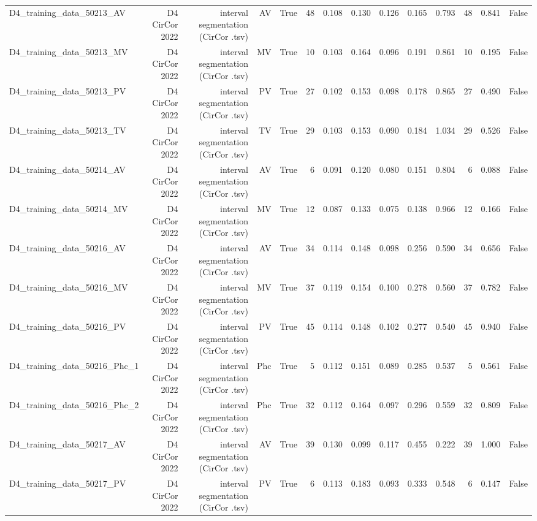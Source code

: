 \begin{table}[htbp]
\begin{tabular}{lrrrrrrrrrrrrr}
    D4\_training\_data\_50213\_AV & D4 CirCor 2022 & interval segmentation (CirCor .tsv) & AV & True & 48 & 0.108 & 0.130 & 0.126 & 0.165 & 0.793 & 48 & 0.841 & False \\
    D4\_training\_data\_50213\_MV & D4 CirCor 2022 & interval segmentation (CirCor .tsv) & MV & True & 10 & 0.103 & 0.164 & 0.096 & 0.191 & 0.861 & 10 & 0.195 & False \\
    D4\_training\_data\_50213\_PV & D4 CirCor 2022 & interval segmentation (CirCor .tsv) & PV & True & 27 & 0.102 & 0.153 & 0.098 & 0.178 & 0.865 & 27 & 0.490 & False \\
    D4\_training\_data\_50213\_TV & D4 CirCor 2022 & interval segmentation (CirCor .tsv) & TV & True & 29 & 0.103 & 0.153 & 0.090 & 0.184 & 1.034 & 29 & 0.526 & False \\
    D4\_training\_data\_50214\_AV & D4 CirCor 2022 & interval segmentation (CirCor .tsv) & AV & True & 6 & 0.091 & 0.120 & 0.080 & 0.151 & 0.804 & 6 & 0.088 & False \\
    D4\_training\_data\_50214\_MV & D4 CirCor 2022 & interval segmentation (CirCor .tsv) & MV & True & 12 & 0.087 & 0.133 & 0.075 & 0.138 & 0.966 & 12 & 0.166 & False \\
    D4\_training\_data\_50216\_AV & D4 CirCor 2022 & interval segmentation (CirCor .tsv) & AV & True & 34 & 0.114 & 0.148 & 0.098 & 0.256 & 0.590 & 34 & 0.656 & False \\
    D4\_training\_data\_50216\_MV & D4 CirCor 2022 & interval segmentation (CirCor .tsv) & MV & True & 37 & 0.119 & 0.154 & 0.100 & 0.278 & 0.560 & 37 & 0.782 & False \\
    D4\_training\_data\_50216\_PV & D4 CirCor 2022 & interval segmentation (CirCor .tsv) & PV & True & 45 & 0.114 & 0.148 & 0.102 & 0.277 & 0.540 & 45 & 0.940 & False \\
    D4\_training\_data\_50216\_Phc\_1 & D4 CirCor 2022 & interval segmentation (CirCor .tsv) & Phc & True & 5 & 0.112 & 0.151 & 0.089 & 0.285 & 0.537 & 5 & 0.561 & False \\
    D4\_training\_data\_50216\_Phc\_2 & D4 CirCor 2022 & interval segmentation (CirCor .tsv) & Phc & True & 32 & 0.112 & 0.164 & 0.097 & 0.296 & 0.559 & 32 & 0.809 & False \\
    D4\_training\_data\_50217\_AV & D4 CirCor 2022 & interval segmentation (CirCor .tsv) & AV & True & 39 & 0.130 & 0.099 & 0.117 & 0.455 & 0.222 & 39 & 1.000 & False \\
    D4\_training\_data\_50217\_PV & D4 CirCor 2022 & interval segmentation (CirCor .tsv) & PV & True & 6 & 0.113 & 0.183 & 0.093 & 0.333 & 0.548 & 6 & 0.147 & False \\

\end{tabular}
\end{table}
